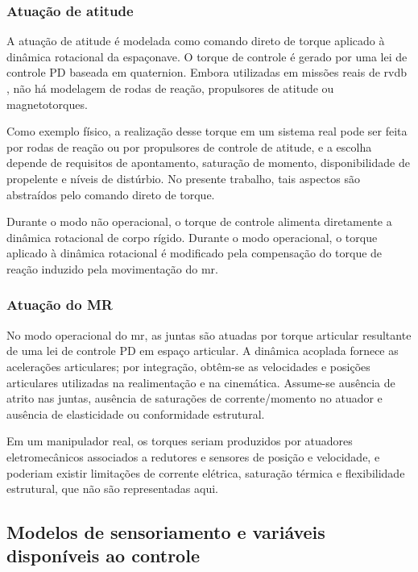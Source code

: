 \subsubsection{Atuação de atitude}
\label{subsubsec:atuacao_atitude}

A atuação de atitude é modelada como comando direto de torque aplicado à dinâmica rotacional da espaçonave.
O torque de controle é gerado por uma lei de controle PD baseada em quaternion.
Embora utilizadas em missões reais de \gls{rvdb} \cite{wertz2011sme_smad}, não há modelagem de rodas de reação, propulsores de atitude ou magnetotorques.

Como exemplo físico, a realização desse torque em um sistema real pode ser feita por rodas de reação ou por propulsores de controle de atitude, e a escolha depende de requisitos de apontamento, saturação de momento, disponibilidade de propelente e níveis de distúrbio. No presente trabalho, tais aspectos são abstraídos pelo comando direto de torque.

Durante o modo não operacional, o torque de controle alimenta diretamente a dinâmica rotacional de corpo rígido.
Durante o modo operacional, o torque aplicado à dinâmica rotacional é modificado pela compensação do torque de reação induzido pela movimentação do \gls{mr}.

\subsubsection{Atuação do MR}
\label{subsubsec:atuacao_mr}

No modo operacional do \gls{mr}, as juntas são atuadas por torque articular resultante de uma lei de controle PD em espaço articular.
A dinâmica acoplada fornece as acelerações articulares; por integração, obtêm-se as velocidades e posições articulares utilizadas na realimentação e na cinemática.
Assume-se ausência de atrito nas juntas, ausência de saturações de corrente/momento no atuador e ausência de elasticidade ou conformidade estrutural.

Em um manipulador real, os torques seriam produzidos por atuadores eletromecânicos \cite{ieee_canadarm_technical} associados a redutores e sensores de posição e velocidade, e poderiam existir limitações de corrente elétrica, saturação térmica e flexibilidade estrutural, que não são representadas aqui.

\subsection{Modelos de sensoriamento e variáveis disponíveis ao controle}
\label{subsec:modelos_sensoriamento_variaveis}

